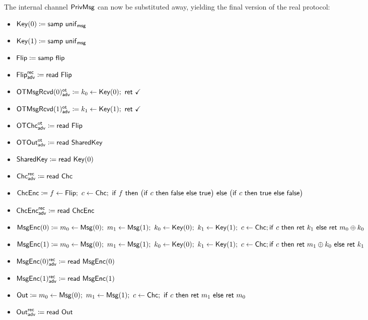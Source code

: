 \noindent The internal channel $\mathsf{PrivMsg}$ can now be substituted away, yielding the final version of the real protocol:

\begin{itemize}
\item $\mathsf{Key}(0) \coloneqq \mathsf{samp} \ \mathsf{unif}_{\mathsf{msg}}$
\item $\mathsf{Key}(1) \coloneqq \mathsf{samp} \ \mathsf{unif}_{\mathsf{msg}}$
\item $\mathsf{Flip} \coloneqq \mathsf{samp} \ \mathsf{flip}$
\item {\color{blue} $\mathsf{Flip}^{\mathsf{rec}}_{\mathsf{adv}} \coloneqq \mathsf{read} \ \mathsf{Flip}$}
\item {\color{blue} $\LeakOTMsgRcvd(0)^\ot_\adv \coloneqq k_0 \leftarrow \Key(0); \ \ret{\checkmark}$}
\item {\color{blue} $\LeakOTMsgRcvd(1)^\ot_\adv \coloneqq k_1 \leftarrow \Key(1); \ \ret{\checkmark}$}
\item {\color{blue} $\mathsf{OTChc}^{\mathsf{ot}}_{\mathsf{adv}} \coloneqq \mathsf{read} \ \mathsf{Flip}$}
\item {\color{blue} $\mathsf{OTOut}^{\mathsf{ot}}_{\mathsf{adv}} \coloneqq \mathsf{read} \ \mathsf{SharedKey}$}
\item $\mathsf{SharedKey} \coloneqq \mathsf{read} \ \mathsf{Key}(0)$
\item {\color{blue} $\mathsf{Chc}^{\mathsf{rec}}_{\mathsf{adv}} \coloneqq \mathsf{read} \ \mathsf{Chc}$}
\item $\ChcEnc \coloneqq f \leftarrow \Flip; \ c \leftarrow \Chc; \ \ifte{f}{\big(\ifte{c}{\false}{\true}\big)}{\big(\ifte{c}{\true}{\false}\big)}$
\item {\color{blue} $\mathsf{ChcEnc}^{\mathsf{rec}}_{\mathsf{adv}} \coloneqq \mathsf{read} \ \mathsf{ChcEnc}$}
\item {\color{red} $\mathsf{MsgEnc}(0) \coloneqq m_0 \leftarrow \mathsf{Msg}(0); \ m_1 \leftarrow \mathsf{Msg}(1); \ k_0 \leftarrow \mathsf{Key}(0); \ k_1 \leftarrow \mathsf{Key}(1); \ c \leftarrow \mathsf{Chc}; \\ \mathsf{if} \ c \ \mathsf{then} \ \mathsf{ret} \ k_1 \ \mathsf{else} \ \mathsf{ret} \ m_0 \oplus k_0$}
\item {\color{red} $\mathsf{MsgEnc}(1) \coloneqq m_0 \leftarrow \mathsf{Msg}(0); \ m_1 \leftarrow \mathsf{Msg}(1); \ k_0 \leftarrow \mathsf{Key}(0); \ k_1 \leftarrow \mathsf{Key}(1); \ c \leftarrow \mathsf{Chc}; \\ \mathsf{if} \ c \ \mathsf{then} \ \mathsf{ret} \ m_1 \oplus k_0 \ \mathsf{else} \ \mathsf{ret} \ k_1$}
\item {\color{blue} $\mathsf{MsgEnc}(0)^{\mathsf{rec}}_{\mathsf{adv}} \coloneqq \mathsf{read} \ \mathsf{MsgEnc}(0)$}
\item {\color{blue} $\mathsf{MsgEnc}(1)^{\mathsf{rec}}_{\mathsf{adv}} \coloneqq \mathsf{read} \ \mathsf{MsgEnc}(1)$}
\item $\Out \coloneqq m_0 \leftarrow \Msg(0); \ m_1 \leftarrow \Msg(1); \ c \leftarrow \Chc; \ \ifte{c}{\ret{m_1}}{\ret{m_0}}$
\item {\color{blue} $\mathsf{Out}^{\mathsf{rec}}_{\mathsf{adv}} \coloneqq \mathsf{read} \ \mathsf{Out}$}
\end{itemize}

